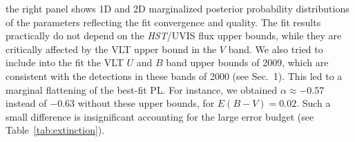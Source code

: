 \documentclass[pdftex,twocolumn]{aastex62}
\newcommand{\gp}[1]{{\color{blue} #1}}
\begin{document}
the right panel 
shows 1D and 2D marginalized posterior probability distributions of the parameters reflecting  the fit convergence and quality. %
The fit results %
practically do not depend 
on the {\sl HST}/UVIS flux upper bounds, while they are  critically affected by the VLT upper bound in the $V$ band.   
We also tried to include into the fit  the VLT $U$ and $B$ 
band upper bounds 
of 2009, which  are consistent with the detections in these bands of 2000 (see Sec.\ 1).   This led  to a marginal flattening of the best-fit PL. For instance, we obtained $\alpha \approx -0.57$ instead of $-0.63$ without these upper bounds, for $E(B-V)=0.02$. Such a small difference is insignificant accounting for the large error budget (see Table~\ref{tab:extinction}).
\end{document}
